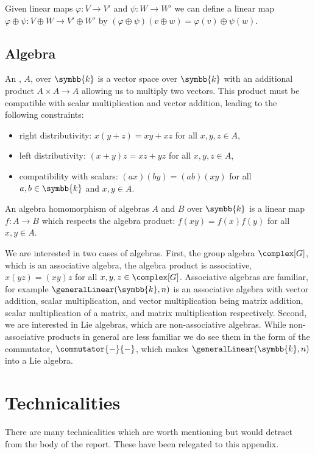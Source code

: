 \documentclass[fleqn]{NotesClass}
\renewcommand{\field}{\symbb{k}}
\begin{document}
\begin{appendices}
        Given linear maps \(\varphi \colon V \to V'\) and \(\psi \colon W \to W'\) we can define a linear map \(\varphi \oplus \psi \colon V \oplus W \to V' \oplus W'\) by \((\varphi \oplus \psi)(v \oplus w) = \varphi(v) \oplus \psi(w)\).
        
        \section{Algebra}\label{sec:algebras}
        An , \(A\), over \(\field\) is a vector space over \(\field\) with an additional product \(A \times A \to A\) allowing us to multiply two vectors.
        This product must be compatible with scalar multiplication and vector addition, leading to the following constraints:
        \begin{itemize}
            \item right distributivity: \(x(y + z) = xy + xz\) for all \(x, y, z \in A\),
            \item left distributivity: \((x + y)z = xz + yz\) for all \(x, y, z \in A\),
            \item compatibility with scalars: \((ax)(by) = (ab)(xy)\) for all \(a, b \in \field\) and \(x, y \in A\).
        \end{itemize}
        
        An algebra homomorphism of algebras \(A\) and \(B\) over \(\field\) is a linear map \(f \colon A \to B\) which respects the algebra product: \(f(xy) = f(x)f(y)\) for all \(x, y \in A\).
        
        We are interested in two cases of algebras.
        First, the group algebra \(\complex[G]\), which is an associative algebra, the algebra product is associative, \(x(yz) = (xy)z\) for all \(x, y, z \in \complex[G]\).
        Associative algebras are familiar, for example \(\generalLinear(\field, n)\) is an associative algebra with vector addition, scalar multiplication, and vector multiplication being matrix addition, scalar multiplication of a matrix, and matrix multiplication respectively.
        Second, we are interested in Lie algebras, which are non-associative algebras.
        While non-associative products in general are less familiar we do see them in the form of the commutator, \(\commutator{-}{-}\), which makes \(\generalLinear(\field, n)\) into a Lie algebra.
        
        \chapter{Technicalities}
        There are many technicalities which are worth mentioning but would detract from the body of the report.
        These have been relegated to this appendix.
        

\end{appendices}
\end{document}
